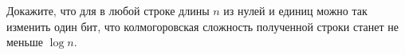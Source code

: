 Докажите, что для в любой строке длины $n$ из нулей и единиц можно так изменить один бит, что
колмогоровская сложность полученной строки станет не меньше $\log n$.